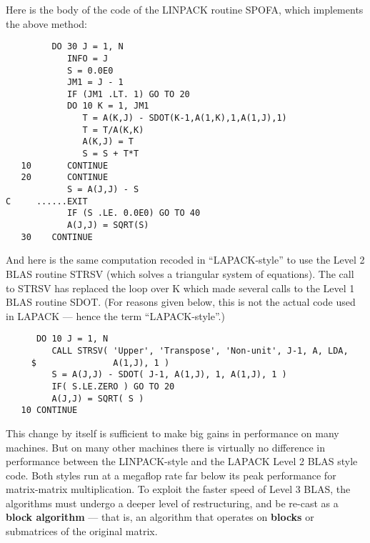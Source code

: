 Here is the body of the code of the LINPACK routine SPOFA,
which implements the above method:

\begin{verbatim}
         DO 30 J = 1, N
            INFO = J
            S = 0.0E0
            JM1 = J - 1
            IF (JM1 .LT. 1) GO TO 20
            DO 10 K = 1, JM1
               T = A(K,J) - SDOT(K-1,A(1,K),1,A(1,J),1)
               T = T/A(K,K)
               A(K,J) = T
               S = S + T*T
   10       CONTINUE
   20       CONTINUE
            S = A(J,J) - S
C     ......EXIT
            IF (S .LE. 0.0E0) GO TO 40
            A(J,J) = SQRT(S)
   30    CONTINUE
\end{verbatim}

And here is the same computation recoded in ``LAPACK-style''
to use the Level 2 BLAS routine
STRSV (which solves a triangular system of equations). The call to STRSV
has replaced the loop over K which made several calls to the
Level 1 BLAS routine SDOT. (For reasons given below, this is not the actual
code used in LAPACK --- hence the term ``LAPACK-style''.)

\begin{verbatim}
      DO 10 J = 1, N
         CALL STRSV( 'Upper', 'Transpose', 'Non-unit', J-1, A, LDA,
     $               A(1,J), 1 )
         S = A(J,J) - SDOT( J-1, A(1,J), 1, A(1,J), 1 )
         IF( S.LE.ZERO ) GO TO 20
         A(J,J) = SQRT( S )
   10 CONTINUE
\end{verbatim}

This change by itself is sufficient to make big gains in performance
on many machines.
But on many other machines
there is virtually no difference in performance between
the LINPACK-style and the LAPACK Level 2 BLAS style code.
Both styles run at a megaflop rate far below its peak performance for
matrix-matrix multiplication.
To exploit the faster speed of Level 3 BLAS, the
algorithms must undergo a deeper level of restructuring, and be re-cast as a
{\bf block algorithm} --- that is, an algorithm that operates on {\bf blocks}
or submatrices of the original matrix.

